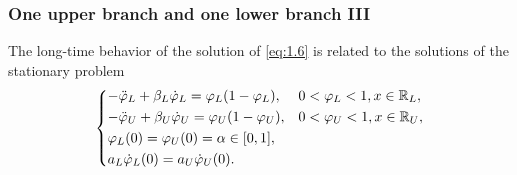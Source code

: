 
\begin{frame}
    \frametitle{One upper branch and one lower branch III}
    The long-time behavior of the solution of \eqref{eq:1.6} is related to the solutions of the stationary problem
    \begin{equation}
        \begin{dcases}
            - \ddot{\varphi}_L + \beta_L \dot{\varphi}_L = \varphi_L(1 - \varphi_L), & 0 < \varphi_L < 1, x \in \mathbb{R}_L, \\
            - \ddot{\varphi}_U + \beta_U \dot{\varphi}_U = \varphi_U(1 - \varphi_U), & 0 < \varphi_U < 1, x \in \mathbb{R}_U, \\
            \varphi_L(0) = \varphi_U(0) = \alpha \in [0, 1], \\
            a_L \dot{\varphi}_L(0) = a_U \dot{\varphi}_U(0).
        \end{dcases}
        \label{eq:1.8}
    \end{equation}
\end{frame}


